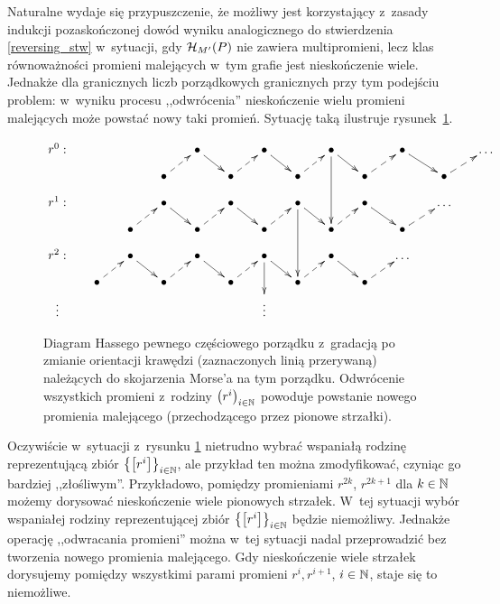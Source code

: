 Naturalne wydaje się przypuszczenie, że możliwy jest korzystający z~zasady indukcji pozaskończonej dowód wyniku analogicznego do stwierdzenia \ref{reversing_stw} w~sytuacji, gdy $\mathcal{H}_{M'}(P)$ nie zawiera multipromieni, lecz klas równoważności promieni malejących w~tym grafie jest nieskończenie wiele. Jednakże dla granicznych liczb porządkowych granicznych przy tym podejściu problem: w~wyniku procesu ,,odwrócenia'' nieskończenie wielu promieni malejących może powstać nowy taki promień. Sytuację taką ilustruje rysunek~\ref{fig-nie_mozna_odwrocic_niesk_wielu}.

\begin{figure}[h]
\[
\xymatrix@C=16pt@R=9pt{
r^0: & & & & \bullet\ar[dr] & & \bullet\ar[dr]& & \bullet\ar[dr]\ar[ddd]  & & \bullet\ar[dr] & & \dots \\
& & & \bullet\ar@{-->}[ur] & & \bullet\ar@{-->}[ur] & & \bullet\ar@{-->}[ur] & & \bullet\ar@{-->}[ur] & & \bullet\ar@{-->}[ur]\\
r^1: & & & \bullet\ar[dr] & & \bullet\ar[dr] & & \bullet\ar[dr]\ar[ddd] & & \bullet\ar[dr] & & \dots \\
& & \bullet\ar@{-->}[ur] & & \bullet\ar@{-->}[ur] & & \bullet\ar@{-->}[ur] & & \bullet\ar@{-->}[ur] & & \bullet\ar@{-->}[ur]\\
r^2: & & \bullet\ar[dr] & & \bullet\ar[dr] & & \bullet\ar[dr]\ar[dd]  & & \bullet\ar[dr] & & \dots \\
& \bullet\ar@{-->}[ur] & & \bullet\ar@{-->}[ur] & & \bullet\ar@{-->}[ur] & & \bullet\ar@{-->}[ur] & & \bullet\ar@{-->}[ur]\\
\vdots & & & & & & \vdots
}
\]
\caption{Diagram Hassego pewnego częściowego porządku z~gradacją po zmianie orientacji krawędzi (zaznaczonych linią przerywaną) należących do skojarzenia Morse'a na tym porządku. Odwrócenie wszystkich promieni z~rodziny $\left(r^i\right)_{i\in\mathbb{N}}$ powoduje powstanie nowego promienia malejącego (przechodzącego przez pionowe strzałki).}\label{fig-nie_mozna_odwrocic_niesk_wielu}
\end{figure}

Oczywiście w~sytuacji z~rysunku \ref{fig-nie_mozna_odwrocic_niesk_wielu} nietrudno wybrać wspaniałą rodzinę reprezentującą zbiór $\left\{\left[r^i\right]\right\}_{i\in\mathbb{N}}$,  ale przykład ten można zmodyfikować, czyniąc go bardziej ,,złośliwym''. Przykładowo, pomiędzy promieniami $r^{2k}$, $r^{2k+1}$ dla $k\in\mathbb{N}$ możemy dorysować nieskończenie wiele pionowych strzałek. W~tej sytuacji wybór wspaniałej rodziny reprezentującej zbiór $\left\{\left[r^i\right]\right\}_{i\in\mathbb{N}}$ będzie niemożliwy. Jednakże operację ,,odwracania promieni'' można w~tej sytuacji nadal przeprowadzić bez tworzenia nowego promienia malejącego. Gdy nieskończenie wiele strzałek dorysujemy pomiędzy wszystkimi parami promieni $r^{i}, r^{i+1}$, $i\in\mathbb{N}$, staje się to niemożliwe. 

